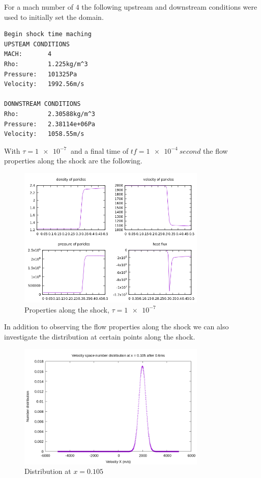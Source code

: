 \documentclass[paper=a4, fontsize=12pt]{scrartcl}
\begin{document}
For a mach number of $4$ the following upstream and downstream conditions were used to initially set the
domain.
\begin{verbatim}
Begin shock time maching
UPSTEAM CONDITIONS
MACH:       4
Rho:        1.225kg/m^3
Pressure:   101325Pa
Velocity:   1992.56m/s

DONWSTREAM CONDITIONS
Rho:        2.30588kg/m^3
Pressure:   2.38114e+06Pa
Velocity:   1058.55m/s
\end{verbatim}
With $\tau = \SI{1e-7}{}$ and a final time of $tf = \SI{1e-4}{second}$ the flow properties along the shock are the following.
\begin{figure}[H]
        \centering
        \includegraphics[width=0.8\textwidth]{mach-4-f}
        \caption{Properties along the shock, $\tau = \SI{1e-7}{}$ }
        \label{fig:mach-4-f}
\end{figure}
In addition to observing the flow properties along the shock we can also investigate the distribution
at certain points along the shock.
\begin{figure}[H]
        \centering
        \includegraphics[width=0.8\textwidth]{left_f-m_4}
        \caption{Distribution at $x=0.105$ }
        \label{fig:left_f-m_4}
\end{figure}
\end{document}
